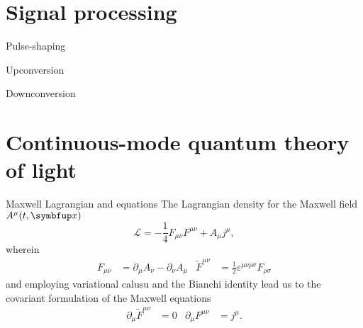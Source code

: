 \documentclass[aspectratio=169,usenames,dvipsnames]{beamer}
\begin{document}
	\section{Signal processing}
	
	\begin{frame}{Pulse-shaping}
		
	\end{frame}
	
	\begin{frame}{Upconversion}
		
	\end{frame}
	
	\begin{frame}{Downconversion}
		
	\end{frame}
	
	\section{Continuous-mode quantum theory of light}
	
	\begin{frame}{Maxwell Lagrangian and equations}
		The Lagrangian density for the Maxwell field $A^\mu(t,\vb{x})$
		\begin{equation}
			\mathcal{L}
			=
			-
			\frac{1}{4}
			F_{\mu\nu}
			F^{\mu\nu}
			+
			A_\mu j^\mu
			,
		\end{equation}
		wherein
		\begin{align}
			F_{\mu\nu}
			&=
			\partial_\mu
			A_\nu
			-
			\partial_\nu
			A_\mu
			&
			\tilde{F}^{\mu\nu}
			&=
			\frac{1}{2}
			\varepsilon^{\mu\nu\rho\sigma}
			F_{\rho\sigma}
		\end{align}
		and employing variational calusu and the Bianchi identity lead us to the covariant formulation of the Maxwell equations
		\begin{align}
			\partial_\mu
			\tilde{F}^{\mu\nu}
			&=
			0
			&
			\partial_\mu
			F^{\mu\nu}
			&=
			j^\mu
			.
		\end{align}
	\end{frame}
\end{document}
